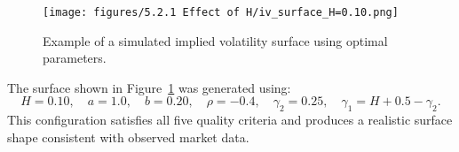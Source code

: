 \begin{figure}[H]
    \centering
    \texttt{[image: figures/5.2.1 Effect of H/iv\_surface\_H=0.10.png]}
    \caption{Example of a simulated implied volatility surface using optimal parameters.}
    \label{fig:BestSurface}
\end{figure}

The surface shown in Figure~\ref{fig:BestSurface} was generated using:
\[
H = 0.10, \quad a = 1.0, \quad b = 0.20, \quad \rho = -0.4, \quad \gamma_2 = 0.25, \quad \gamma_1 = H + 0.5 - \gamma_2.
\]
This configuration satisfies all five quality criteria and produces a realistic surface shape consistent with observed market data.